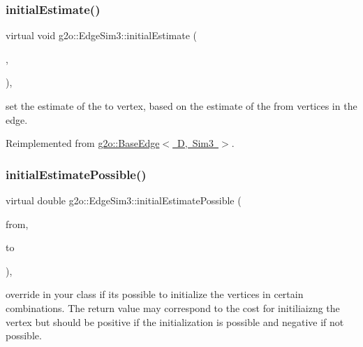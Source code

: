 \subsubsection{\texorpdfstring{initial\+Estimate()}{initialEstimate()}}
{\footnotesize\ttfamily virtual void g2o\+::\+Edge\+Sim3\+::initial\+Estimate (\begin{DoxyParamCaption}\item[{const \mbox{\hyperlink{classg2o_1_1_hyper_graph_a703938cdb4bb636860eed55a2489d70c}{Optimizable\+Graph\+::\+Vertex\+Set}} \&}]{,  }\item[{\mbox{\hyperlink{classg2o_1_1_optimizable_graph_1_1_vertex}{Optimizable\+Graph\+::\+Vertex}} $\ast$}]{ }\end{DoxyParamCaption})\hspace{0.3cm}{\ttfamily [inline]}, {\ttfamily [virtual]}}

set the estimate of the to vertex, based on the estimate of the from vertices in the edge. 

Reimplemented from \mbox{\hyperlink{classg2o_1_1_base_edge_a0c3d9763f1dc504627df75e0f381ca70}{g2o\+::\+Base\+Edge$<$ D, Sim3 $>$}}.

\mbox{\label{classg2o_1_1_edge_sim3_a0fd73623327838b46abdf292582da6ae}} 
\subsubsection{\texorpdfstring{initial\+Estimate\+Possible()}{initialEstimatePossible()}}
{\footnotesize\ttfamily virtual double g2o\+::\+Edge\+Sim3\+::initial\+Estimate\+Possible (\begin{DoxyParamCaption}\item[{const \mbox{\hyperlink{classg2o_1_1_hyper_graph_a703938cdb4bb636860eed55a2489d70c}{Optimizable\+Graph\+::\+Vertex\+Set}} \&}]{from,  }\item[{\mbox{\hyperlink{classg2o_1_1_optimizable_graph_1_1_vertex}{Optimizable\+Graph\+::\+Vertex}} $\ast$}]{to }\end{DoxyParamCaption})\hspace{0.3cm}{\ttfamily [inline]}, {\ttfamily [virtual]}}

override in your class if it\textquotesingle{}s possible to initialize the vertices in certain combinations. The return value may correspond to the cost for initiliaizng the vertex but should be positive if the initialization is possible and negative if not possible. 

